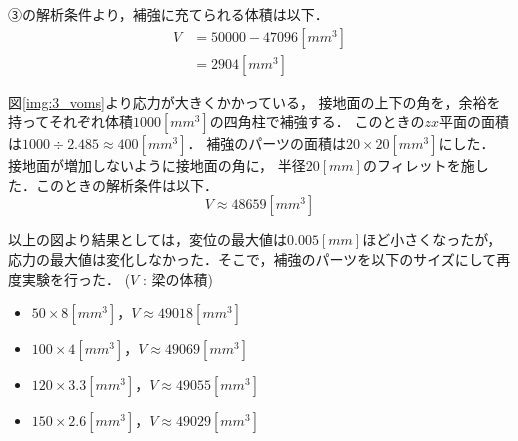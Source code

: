   ③の解析条件より，補強に充てられる体積は以下．
  \begin{align*}
    V &= 50000 - 47096[mm^3] \\
      &= 2904[mm^3]
  \end{align*}

  
  図\ref{img:3_voms}より応力が大きくかかっている，
  接地面の上下の角を，余裕を持ってそれぞれ体積$1000[mm^3]$の四角柱で補強する．
  このときの$zx$平面の面積は$1000 \div 2.485 \approx 400[mm^3]$．
  補強のパーツの面積は$20 \times 20 [mm^3]$にした．
  接地面が増加しないように接地面の角に，
  半径$20[mm]$のフィレットを施した．このときの解析条件は以下．
  \begin{equation*}
    V \approx 48659[mm^3]
  \end{equation*}

  以上の図より結果としては，変位の最大値は$0.005[mm]$ほど小さくなったが，
  応力の最大値は変化しなかった．そこで，補強のパーツを以下のサイズにして再度実験を行った．
  ($V$ : 梁の体積)
  \begin{itemize}
    \item $50\times8[mm^3]$，$V \approx 49018[mm^3]$
    \item $100\times4[mm^3]$，$V \approx 49069[mm^3]$
    \item $120\times3.3[mm^3]$，$V \approx 49055[mm^3]$
    \item $150\times2.6[mm^3]$，$V \approx 49029[mm^3]$
  \end{itemize}

